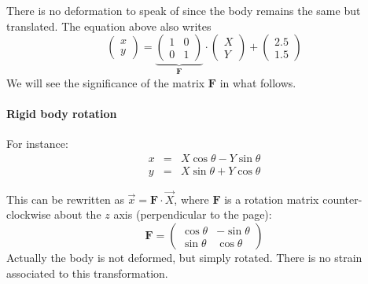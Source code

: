 There is no deformation to speak of since the body remains the same but translated. The equation above also writes
\[
\left(
\begin{array}{c}
x \\ y
\end{array}
\right)
=
\underbrace{
\left(
\begin{array}{cc}
1 & 0 \\
0 & 1
\end{array}
\right)
}_{\bm F}
\cdot
\left(
\begin{array}{c}
X \\ Y
\end{array}
\right)
+
\left(
\begin{array}{c}
2.5 \\ 1.5
\end{array}
\right)
\]
We will see the significance of the matrix ${\bm F}$ in what follows.

\paragraph{Rigid body rotation} For instance:
\begin{eqnarray}
x &=& X \cos \theta - Y \sin \theta \\ 
y &=& X \sin \theta + Y \cos \theta 
\end{eqnarray}


\begin{center}
\end{center}



This can be rewritten as $\vec{x}={\bm F}\cdot \vec{X}$, where 
${\bm F}$ is a rotation matrix counter-clockwise about the $z$ axis (perpendicular
to the page):
\[
{\bm F} = 
\left(
\begin{array}{cc}
\cos\theta & -\sin\theta \\
\sin\theta & \cos\theta 
\end{array}
\right)
\]
Actually the body is not deformed, but simply rotated. There is no strain associated to this 
transformation. 


